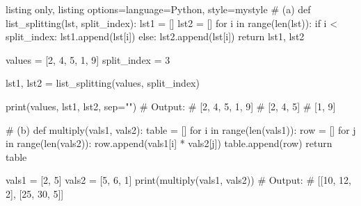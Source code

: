 \documentclass[11pt, oneside]{book}
\begin{document}
\begin{tcblisting}{listing only, listing options={language=Python, style=mystyle}}
# (a)
def list_splitting(lst, split_index):
    lst1 = []
    lst2 = []
    for i in range(len(lst)):
        if i < split_index:
            lst1.append(lst[i])
        else:
            lst2.append(lst[i])
    return lst1, lst2

values = [2, 4, 5, 1, 9] 
split_index = 3

lst1, lst2 = list_splitting(values, split_index)

print(values, lst1, lst2, sep="\n")
# Output:
# [2, 4, 5, 1, 9]
# [2, 4, 5]
# [1, 9]

# (b)
def multiply(vals1, vals2):
    table = []
    for i in range(len(vals1)):
        row = []
        for j in range(len(vals2)):
            row.append(vals1[i] * vals2[j])
        table.append(row)
    return table

vals1 = [2, 5]
vals2 = [5, 6, 1]
print(multiply(vals1, vals2))
# Output:
# [[10, 12, 2], [25, 30, 5]]
\end{tcblisting}
\end{document}
